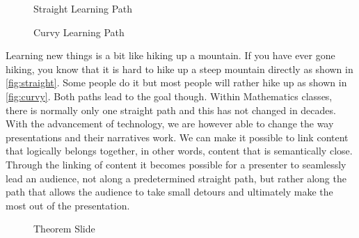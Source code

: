\documentclass{llncs}
\begin{document}
\begin{figure}
\vspace{-28pt}
  \begin{center}
\vspace{-20pt}
  \caption{Straight Learning Path}
  \label{fig:straight}
\vspace{5pt}  

  \end{center}
\vspace{-20pt}
  \caption{Curvy Learning Path}
  \label{fig:curvy}
\vspace{-10pt}
\end{figure}

Learning new things is a bit like hiking up a mountain. If you have ever gone hiking, you know that it is hard to hike up a steep mountain directly as shown in \autoref{fig:straight}. Some people do it but most people will rather hike up as shown in \autoref{fig:curvy}. Both paths lead to the goal though. Within Mathematics classes, there is normally only one straight path and this has not changed in decades. With the advancement of technology, we are however able to change the way presentations and their narratives work. We can make it possible to link content that logically belongs together, in other words, content that is semantically close. Through the linking of content it becomes possible for a presenter to seamlessly lead an audience, not along a predetermined straight path, but rather along the path that allows the audience to take small detours and ultimately make the most out of the presentation.

\begin{figure}
\vspace{-28pt}
  \begin{center}
  \end{center}
\vspace{-20pt}
  \caption{Theorem Slide}
  \label{fig:slideP}
\vspace{-15pt}
\end{figure}
\end{document}
